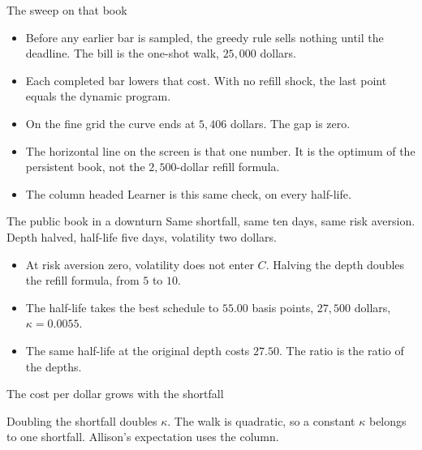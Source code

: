 \documentclass[aspectratio=169,10pt]{beamer}
\newcommand{\currentsource}{}
\newcommand{\framesource}[1]{\gdef\currentsource{#1}}
\newcommand{\aiassisted}{AI assisted, via Grok 4.7}
\begin{document}
\begin{frame}{The sweep on that book}
\framesource{\aiassisted}
\begin{itemize}
\item Before any earlier bar is sampled, the greedy rule sells nothing until the deadline. The bill is the one-shot walk, \(25{,}000\) dollars.
\item Each completed bar lowers that cost. With no refill shock, the last point equals the dynamic program.
\item On the fine grid the curve ends at \(5{,}406\) dollars. The gap is zero.
\item The horizontal line on the screen is that one number. It is the optimum of the persistent book, not the \(2{,}500\)-dollar refill formula.
\item The column headed Learner is this same check, on every half-life.
\end{itemize}
\end{frame}

\begin{frame}{The public book in a downturn}
\framesource{\aiassisted}
Same shortfall, same ten days, same risk aversion. Depth halved, half-life five days, volatility two dollars.

\vspace{0.45em}
\usebox{\downturntable}

\vspace{0.55em}
\begin{itemize}
\item At risk aversion zero, volatility does not enter \(C\). Halving the depth doubles the refill formula, from \(5\) to \(10\).
\item The half-life takes the best schedule to \(55.00\) basis points, \(27{,}500\) dollars, \(\kappa=0.0055\).
\item The same half-life at the original depth costs \(27.50\). The ratio is the ratio of the depths.
\end{itemize}
\end{frame}

\begin{frame}{The cost per dollar grows with the shortfall}
\framesource{\aiassisted}
\usebox{\sizetable}

\vspace{0.7em}
Doubling the shortfall doubles \(\kappa\). The walk is quadratic, so a constant \(\kappa\) belongs to one shortfall. Allison's expectation uses the column.
\end{frame}
\end{document}
